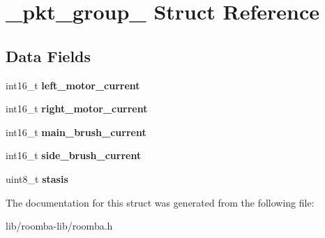 \hypertarget{struct__pkt__group__107}{}\section{\+\_\+pkt\+\_\+group\+\_ Struct Reference}
\label{struct__pkt__group__107}
\subsection*{Data Fields}
\begin{DoxyCompactItemize}
\item 
\hypertarget{group__roomba-lib_ga1a8fd8fdbde5ae27c089a7d7ec1bc43a}{}int16\+\_\+t {\bfseries left\+\_\+motor\+\_\+current}\label{group__roomba-lib_ga1a8fd8fdbde5ae27c089a7d7ec1bc43a}

\item 
\hypertarget{group__roomba-lib_gaeb30e39724a737ddec26de7fa00c837f}{}int16\+\_\+t {\bfseries right\+\_\+motor\+\_\+current}\label{group__roomba-lib_gaeb30e39724a737ddec26de7fa00c837f}

\item 
\hypertarget{group__roomba-lib_ga0135c0b235c3206d5f666f0c595ed366}{}int16\+\_\+t {\bfseries main\+\_\+brush\+\_\+current}\label{group__roomba-lib_ga0135c0b235c3206d5f666f0c595ed366}

\item 
\hypertarget{group__roomba-lib_gace7e4ea4d207869a25a51ac94a52eb9f}{}int16\+\_\+t {\bfseries side\+\_\+brush\+\_\+current}\label{group__roomba-lib_gace7e4ea4d207869a25a51ac94a52eb9f}

\item 
\hypertarget{group__roomba-lib_ga0ed18b08023ce3926077caf11e77592a}{}uint8\+\_\+t {\bfseries stasis}\label{group__roomba-lib_ga0ed18b08023ce3926077caf11e77592a}

\end{DoxyCompactItemize}


The documentation for this struct was generated from the following file\+:\begin{DoxyCompactItemize}
\item 
lib/roomba-\/lib/roomba.\+h\end{DoxyCompactItemize}
